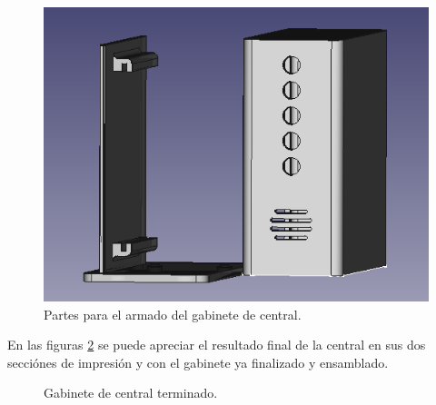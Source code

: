 \begin{figure}[!h]
	\centering
	\includegraphics[scale=.53]{images/central/modelo-3d-central-separado.png}
    \caption{Partes para el armado del gabinete de central.}
	\label{im:impresion-central}
\end{figure}

En las figuras \ref{central} se puede apreciar el resultado final de la central en sus dos secciónes de impresión y con el gabinete
ya finalizado y ensamblado.

\begin{figure}[!h]
	\begin{center}
		\caption{Gabinete de central terminado.}
		\label{central}
	\end{center}
\end{figure}